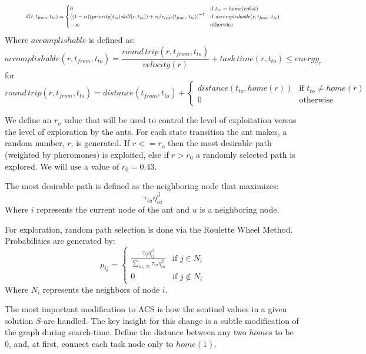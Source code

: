 \documentclass[a4paper]{article}
\begin{document}
\begin{equation*}
\resizebox{0.9\textwidth}{!}{$
\mathit{d}(r, t_\mathit{from}, t_\mathit{to}) = \begin{cases}
  0 & \text{if } t_\mathit{to} = \mathit{home}(robot) \\
  \left(
  (1 - \alpha)
    (\mathit{priority}(t_\mathit{to}) \mathit{skill}(r, t_\mathit{to})) +
    \alpha \beta
    \mathit{e}_{cost}(t_\mathit{from}, t_\mathit{to})
  \right)^{-1}
  & \text{if }\mathit{accomplishable}(r, t_\mathit{from}, t_\mathit{to}) \\
  - \infty
  & \text{otherwise} \\
\end{cases}
$}
\end{equation*}
Where $\mathit{accomplishable}$ is defined as:
$$
\mathit{accomplishable}(r, t_\mathit{from}, t_\mathit{to}) =
\frac{\mathit{round\,trip}(r, t_\mathit{from}, t_\mathit{to})}{velocity(r)} + \mathit{task \, time}(r, t_\mathit{to}) \leq \mathit{energy}_r
$$
for
$$
\mathit{round\,trip}(r, t_\mathit{from}, t_\mathit{to}) = \mathit{distance}(t_\mathit{from}, t_\mathit{to}) + \begin{cases}
\mathit{distance}(t_\mathit{to}, \mathit{home}(r)) & \text{if } t_\mathit{to} \ne \mathit{home}(r) \\
0 & \text{otherwise}
\end{cases}
$$

We define an $r_o$ value that will be used to control the level of exploitation versus the level of exploration by the ants.
For each state transition the ant makes, a random number, $r$, is generated.
If $r<=r_o$ then the most desirable path (weighted by pheromones) is exploited, else if $r>r_0$
a randomly selected path is explored. We will use a value of $r_0=0.43$.

The most desirable path is defined as the neighboring node that maximizes:
$$
\tau_{iu}\eta_{iu}^\beta
$$
Where $i$ represents the current node of the ant and $u$ is a neighboring node.

For exploration, random path selection is done via the Roulette Wheel Method.
Probabilities are generated by:
$$
p_{ij}=
\begin{cases}
\frac{\tau_{ij}\eta_{ij}^\beta}{\sum\limits_{u\in N_i} \tau_{iu}\eta_{iu}^\beta} & \text{if } j \in N_i\\
0 & \text{if } j \not\in N_i
\end{cases}
$$
Where $N_i$ represents the neighbors of node $i$.

The most important modification to ACS is how the sentinel values in a given solution $S$ are handled.
The key insight for this change is a subtle modification of the graph during search-time. Define the distance between any
two $home$s to be 0, and, at first, connect each task node only to $home(1)$.
\end{document}
